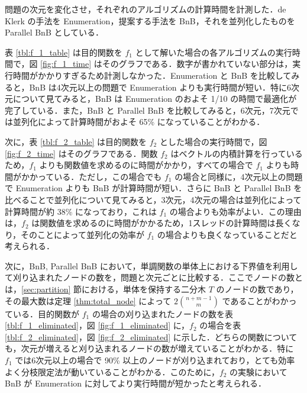 \documentclass[a4paper,11pt]{jreport}
\begin{document}
問題の次元を変化させ，それぞれのアルゴリズムの計算時間を計測した．de Klerk の手法を Enumeration，提案する手法を BnB，それを並列化したものを Parallel BnB としている．\par
表 \ref{tbl:f_1_table} は目的関数を $ f_1 $ として解いた場合の各アルゴリズムの実行時間で，図 \ref{fig:f_1_time} はそのグラフである．数字が書かれていない部分は，実行時間がかかりすぎるため計測しなかった．Enumeration と BnB を比較してみると，BnB は4次元以上の問題で Enumeration よりも実行時間が短い．特に6次元について見てみると，BnB は Enumeration のおよそ 1/10 の時間で最適化が完了している．また，BnB と Parallel BnB を比較してみると，6次元，7次元では並列化によって計算時間がおよそ 65\% になっていることがわかる．\par
次に，表 \ref{tbl:f_2_table} は目的関数を $ f_2 $ とした場合の実行時間で，図 \ref{fig:f_2_time} はそのグラフである．関数 $ f_2 $ はベクトルの内積計算を行っているため，$ f_1 $ よりも関数値を求めるのに時間がかかり，すべての場合で $ f_1 $ よりも時間がかかっている．ただし，この場合でも $ f_1 $ の場合と同様に，4次元以上の問題で Enumeration よりも BnB が計算時間が短い．さらに BnB と Parallel BnB を比べることで並列化について見てみると，3次元，4次元の場合は並列化によって計算時間が約 38\% になっており，これは $ f_1 $ の場合よりも効率がよい．この理由は，$ f_2 $ は関数値を求めるのに時間がかかるため，1スレッドの計算時間は長くなり，そのことによって並列化の効率が $ f_1 $ の場合よりも良くなっていることだと考えられる．\par
次に，BnB, Parallel BnB において，単調関数の単体上における下界値を利用して刈り込まれたノードの数を，問題と次元ごとに比較する．ここでノードの数とは，\ref{sec:partition} 節における，単体を保持する二分木 $ T $ のノードの数であり，その最大数は定理 \ref{thm:total_node} によって $ 2 \binom{n + m - 1}{m} $ であることがわかっている．目的関数が $ f_1 $ の場合の刈り込まれたノードの数を表 \ref{tbl:f_1_eliminated}，図 \ref{fig:f_1_eliminated} に，$ f_2 $ の場合を表 \ref{tbl:f_2_eliminated}，図 \ref{fig:f_2_eliminated} に示した．どちらの関数についても，次元が増えると刈り込まれるノードの数が増えていることがわかる．特に $ f_1 $ では6次元以上の場合で 90\% 以上のノードが刈り込まれており，とても効率よく分枝限定法が動いていることがわかる．このために，$ f_2 $ の実験において BnB が Enumeration に対してより実行時間が短かったと考えられる．\par

\newpage
\end{document}
